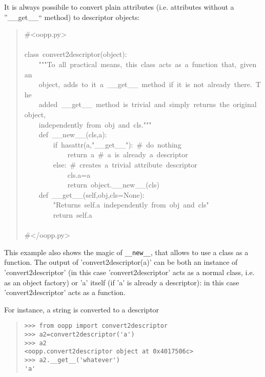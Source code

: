 \documentclass[10pt,english]{article}
\begin{document}
It is always possibile to convert plain attributes (i.e. attributes
without a ''{\_}{\_}get{\_}{\_}`` method) to descriptor objects:
\begin{quote}
\begin{ttfamily}\begin{flushleft}
\mbox{{\#}<oopp.py>}\\
\mbox{}\\
\mbox{class~convert2descriptor(object):}\\
\mbox{~~~~"""To~all~practical~means,~this~class~acts~as~a~function~that,~given~an}\\
\mbox{~~~~object,~adds~to~it~a~{\_}{\_}get{\_}{\_}~method~if~it~is~not~already~there.~The~}\\
\mbox{~~~~added~{\_}{\_}get{\_}{\_}~method~is~trivial~and~simply~returns~the~original~object,~}\\
\mbox{~~~~independently~from~obj~and~cls."""}\\
\mbox{~~~~def~{\_}{\_}new{\_}{\_}(cls,a):}\\
\mbox{~~~~~~~~if~hasattr(a,"{\_}{\_}get{\_}{\_}"):~{\#}~do~nothing}\\
\mbox{~~~~~~~~~~~~return~a~{\#}~a~is~already~a~descriptor}\\
\mbox{~~~~~~~~else:~{\#}~creates~a~trivial~attribute~descriptor}\\
\mbox{~~~~~~~~~~~~cls.a=a}\\
\mbox{~~~~~~~~~~~~return~object.{\_}{\_}new{\_}{\_}(cls)}\\
\mbox{~~~~def~{\_}{\_}get{\_}{\_}(self,obj,cls=None):}\\
\mbox{~~~~~~~~"Returns~self.a~independently~from~obj~and~cls"}\\
\mbox{~~~~~~~~return~self.a}\\
\mbox{}\\
\mbox{{\#}</oopp.py>}
\end{flushleft}\end{ttfamily}
\end{quote}

This example also shows the magic of \texttt{{\_}{\_}new{\_}{\_}}, that allows to use a
class as a function. The output of 'convert2descriptor(a)' can be both 
an instance of 'convert2descriptor' (in this case 'convert2descriptor' acts as 
a normal class, i.e. as an object factory) or 'a' itself 
(if 'a' is already a descriptor): in this case 'convert2descriptor' acts 
as a function.

For instance, a string is converted to a descriptor
\begin{quote}
\begin{verbatim}>>> from oopp import convert2descriptor
>>> a2=convert2descriptor('a')
>>> a2
<oopp.convert2descriptor object at 0x4017506c>
>>> a2.__get__('whatever')
'a'\end{verbatim}
\end{quote}
\end{document}
